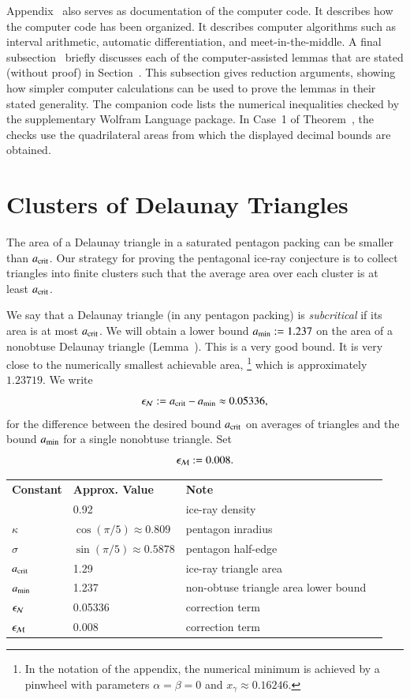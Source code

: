 Appendix~ also serves as documentation of the
computer code.  It describes how the computer code has been
organized. It describes computer algorithms such as interval
arithmetic, automatic differentiation, and meet-in-the-middle.  A
final subsection~ briefly discusses each of the
computer-assisted lemmas that are stated (without proof) in
Section~.  This subsection gives reduction arguments,
showing how simpler computer calculations can be used to prove the
lemmas in their stated generality.
The companion code lists the numerical inequalities checked by the
supplementary Wolfram Language package. In Case~1 of
Theorem~, the checks use the quadrilateral areas from
which the displayed decimal bounds are obtained.

\section{Clusters of Delaunay Triangles}

The area of a Delaunay triangle in a saturated pentagon packing can be
smaller than $a_\text{crit}$.  Our strategy for proving the pentagonal
ice-ray conjecture is to collect triangles into finite clusters such
that the average area over each cluster is at least $a_\text{crit}$.

We say that a Delaunay triangle (in any pentagon packing) is {\it
  subcritical} if its area is at most $a_\text{crit}$.  We will obtain a
lower bound $a_\text{min} := 1.237$ on the area of a nonobtuse Delaunay
triangle (Lemma~).  This is a very good bound.  It is
very close to the numerically smallest achievable area,%
\footnote{In the notation of the appendix, the
  numerical minimum is achieved by a pinwheel with parameters
  $\alpha=\beta=0$ and $x_\gamma\approx 0.16246$.}
 which is
approximately $1.23719$.  We write 
\begin{equation}\libel{eqn:epsN}
\epsN :=
\acrit - \ao \approx 0.05336,
\end{equation} for the difference between the desired
bound $a_\text{crit}$ on averages of triangles and the bound $a_\text{min}$ for a
single nonobtuse triangle.  Set
\begin{equation}\libel{eqn:epsM}
\epsM := 0.008.
\end{equation}

\bigskip
{}%
{
\begin{tabular}{llll}
{\bf Constant} & {\bf Approx. Value} & {\bf Note} \\
& 0.92 & ice-ray density\\
$\kappa$ & $\cos(\pi/5)\approx 0.809$ & pentagon inradius \\
$\sigma$ &$\sin(\pi/5)\approx 0.5878$ & pentagon half-edge \\
$a_\text{crit}$ &1.29 & ice-ray triangle area\\
$a_\text{min}$ & 1.237 & non-obtuse triangle area lower bound\\
$\epsilon_{\mathcal N}$ & 0.05336 & correction term\\
$\epsilon_{\mathcal M}$ & 0.008 & correction term\\
\end{tabular}
}

